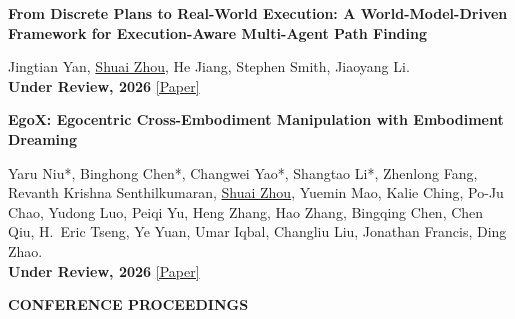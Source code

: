 \documentclass[a4paper,9pt]{extarticle}
\newenvironment{publicationlist}[1]{%
    \renewcommand{\theenumi}{#1\arabic{enumi}}%
    \renewcommand{\labelenumi}{[\theenumi]}%
    \begin{etaremune}[leftmargin=2.8em,labelwidth=2.3em,labelsep=0.5em,
        itemsep=0pt,parsep=0pt]%
}{%
    \end{etaremune}%
}
\begin{document}
\begin{publicationlist}{P}
\item{}\label{pub:execution-mapf} \textbf{From Discrete Plans to Real-World Execution: A World-Model-Driven Framework for Execution-Aware Multi-Agent Path Finding}
\par\textup{Jingtian Yan, \underline{Shuai Zhou}, He Jiang, Stephen Smith, Jiaoyang Li. \\ \textbf{Under Review, 2026} \href{https://arxiv.org/abs/2511.21886}{[Paper]}}
\item{}\label{pub:egox} \textbf{EgoX: Egocentric Cross-Embodiment Manipulation with Embodiment Dreaming}
\par\textup{Yaru Niu*, Binghong Chen*, Changwei Yao*, Shangtao Li*, Zhenlong Fang, Revanth Krishna Senthilkumaran, \underline{Shuai Zhou}, Yuemin Mao, Kalie Ching, Po-Ju Chao, Yudong Luo, Peiqi Yu, Heng Zhang, Hao Zhang, Bingqing Chen, Chen Qiu, H.~Eric Tseng, Ye Yuan, Umar Iqbal, Changliu Liu, Jonathan Francis, Ding Zhao. \\ \textbf{Under Review, 2026} \href{https://arxiv.org/abs/2611.16728}{[Paper]}}

\end{publicationlist}
\vspace{-0.02in}
{\textbf{\fontsize{12pt}{4pt}\selectfont C}\textbf{\scshape ONFERENCE PROCEEDINGS}}
\vspace{-0.05in}
\end{document}
